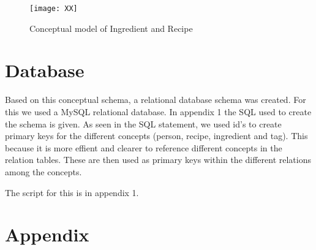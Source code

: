 \documentclass{article}
\begin{document}
\begin{figure}[H]
\centering
\texttt{[image: XX]}
\caption{Conceptual model of Ingredient and Recipe}
\end{figure}


\section{Database}
Based on this conceptual schema, a relational database schema was created. For this we used a MySQL relational database. In appendix 1 the SQL used to create the schema is given. As seen in the SQL statement, we used id's to create primary keys for the different concepts (person, recipe, ingredient and tag). This because it is more effient and clearer to reference different concepts in the relation tables. These are then used as primary keys within the different relations among the concepts. 

The script for this is in appendix 1.

\section*{Appendix}
\end{document}
